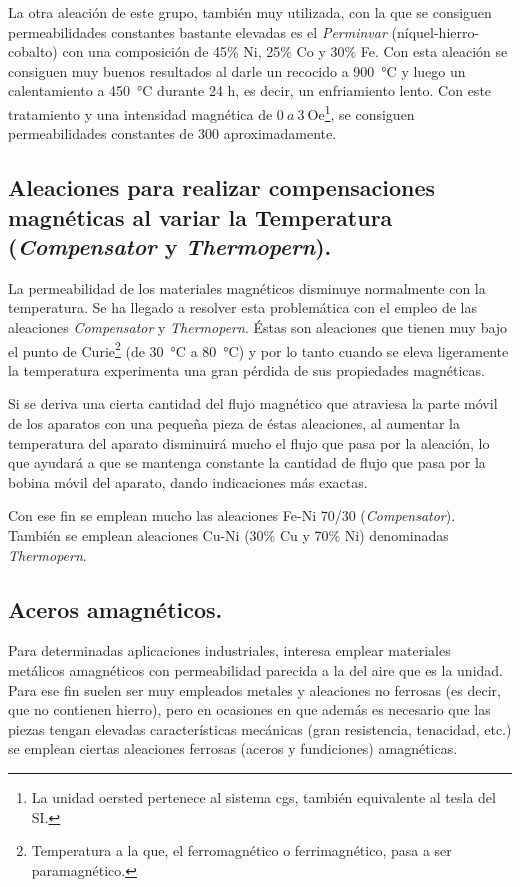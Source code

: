 \documentclass[12pt,a4paper]{article}
\begin{document}
La otra aleación de este grupo, también muy utilizada, con la que se consiguen permeabilidades constantes bastante elevadas es el \textit{Perminvar} (níquel-hierro-cobalto) con una composición de 45\% Ni, 25\% Co y 30\% Fe. Con esta aleación se consiguen muy buenos resultados al darle un recocido a \SI{900}{\celsius} y luego un calentamiento a \SI{450}{\celsius} durante 24 h, es decir, un enfriamiento lento. Con este tratamiento y una intensidad magnética de $0\ a\ 3\ \mathrm{Oe}$\footnote{La unidad oersted pertenece al sistema cgs, también equivalente al tesla del SI.}, se consiguen permeabilidades constantes de 300 aproximadamente.

\subsection{Aleaciones para realizar compensaciones magnéticas al variar la Temperatura (\textit{Compensator} y \textit{Thermopern}).}

La permeabilidad de los materiales magnéticos disminuye normalmente con la temperatura. Se ha llegado a resolver esta problemática con el empleo de las aleaciones \textit{Compensator} y \textit{Thermopern}. Éstas son aleaciones que tienen muy bajo el punto de Curie\footnote{Temperatura a la que, el ferromagnético o ferrimagnético, pasa a ser paramagnético.} (de \SI{30}{\celsius} a \SI{80}{\celsius}) y por lo tanto cuando se eleva ligeramente la temperatura experimenta una gran pérdida de sus propiedades magnéticas.

Si se deriva una cierta cantidad del flujo magnético que atraviesa la parte móvil de los aparatos con una pequeña pieza de éstas aleaciones, al aumentar la temperatura del aparato disminuirá mucho el flujo que pasa por la aleación, lo que ayudará a que se mantenga constante la cantidad de flujo que pasa por la bobina móvil del aparato, dando indicaciones más exactas.

Con ese fin se emplean mucho las aleaciones Fe-Ni 70/30 (\textit{Compensator}). También se emplean aleaciones Cu-Ni (30\% Cu y 70\% Ni) denominadas \textit{Thermopern}.

\subsection{Aceros amagnéticos.}

Para determinadas aplicaciones industriales, interesa emplear materiales metálicos amagnéticos con permeabilidad parecida a la del aire que es la unidad. Para ese fin suelen ser muy empleados metales y aleaciones no ferrosas (es decir, que no contienen hierro), pero en ocasiones en que además es necesario que las piezas tengan elevadas características mecánicas (gran resistencia, tenacidad, etc.) se emplean ciertas aleaciones ferrosas (aceros y fundiciones) amagnéticas.
\end{document}
